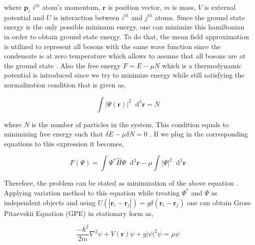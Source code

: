\documentclass[a4paper,times,hidelinks,12pt]{article}
\newcommand*\dif{\mathop{}\!\mathrm{d}}
\begin{document}
where $\textbf{p}_i$ $i^{th}$ atom's momentum, $\boldsymbol{r}$ is position vector, $m$ is mass, $V$ is external potential and $U$ is interaction between $i^{th}$ and $j^{th}$  atoms. Since the ground state energy is the only possible minimum energy, one can minimize this hamiltonian in order to obtain ground state energy. To do that, the mean field approximation is utilized to represent all bosons with the same wave function since the condensate is at zero temperature which allows to assume that all bosons are at the ground state \cite{pethick2002bose}. Also the free energy $F = E - \mu N$ which is a thermodynamic potential is introduced since we try to minimize energy while still satisfying the normalization condition that is given as, 

\begin{equation}
\label{eq:GPE_normalization}
\int |\Psi(\boldsymbol{r})|^2 \dif^3 \boldsymbol{r} = N    
\end{equation}

where $N$ is the number of particles in the system. This condition equals to minimizing free energy such that $\delta E - \mu \delta N = 0$ \cite{pethick2002bose}. If we plug in the corresponding equations to this expression it becomes,  

\begin{equation}
\label{eq:GPE_derivation_free_energy}
F(\Psi) = \int \Psi^{*}\hat{H}\Psi \dif^3\boldsymbol{r} - \mu \int |\Psi|^2 \dif^3\boldsymbol{r}
\end{equation}

Therefore, the problem can be stated as minimization of the above equation \cite{rogel2013gross}. Applying variation method to this equation while treating $\Psi^{*}$
and $\Psi$ as independent objects and using $U(|\textbf{r}_i - \textbf{r}_j|) = g\delta(\textbf{r}_i - \textbf{r}_j)$ one can obtain Gross Pitaevskii Equation (GPE) in stationary form as, 

\begin{equation}
\label{eq:GPE_time_indep}
\frac{-\hbar^2}{2m}\nabla^2\psi + V(\boldsymbol{r})\psi + g|\psi|^2\psi = \mu\psi
\end{equation}

%
\end{document}
